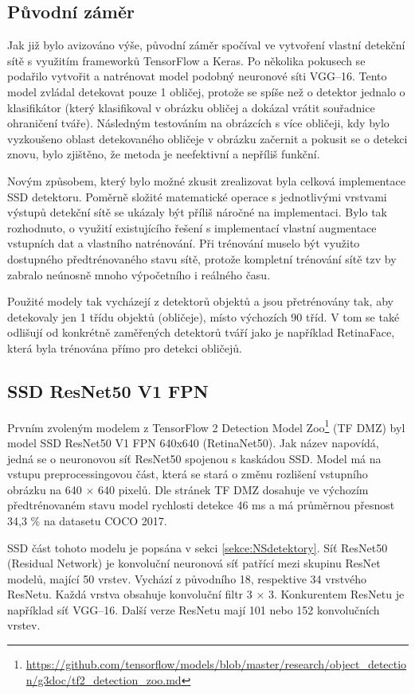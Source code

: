 \subsection*{Původní záměr}
Jak již bylo avizováno výše, původní záměr spočíval ve vytvoření vlastní detekční sítě s využitím frameworků TensorFlow a Keras. Po několika pokusech se podařilo vytvořit a natrénovat model podobný neuronové síti VGG--16. Tento model zvládal detekovat pouze 1 obličej, protože se spíše než o detektor jednalo o klasifikátor (který klasifikoval v obrázku obličej a dokázal vrátit souřadnice ohraničení tváře). Následným testováním na obrázcích s více obličeji, kdy bylo vyzkoušeno oblast detekovaného obličeje v obrázku začernit a pokusit se o detekci znovu, bylo zjištěno, že metoda je neefektivní a nepříliš funkční.

Novým způsobem, který bylo možné zkusit zrealizovat byla celková implementace SSD detektoru. Poměrně složité matematické operace s jednotlivými vrstvami výstupů detekční sítě se ukázaly být příliš náročné na implementaci. Bylo tak rozhodnuto, o využití existujícího řešení s implementací vlastní augmentace vstupních dat a vlastního natrénování. Při trénování muselo být využito dostupného předtrénovaného stavu sítě, protože kompletní trénování sítě tzv  by zabralo neúnosně mnoho výpočetního i reálného času.

Použité modely tak vycházejí z detektorů objektů a jsou přetrénovány tak, aby detekovaly jen 1 třídu objektů (obličeje), místo výchozích 90 tříd. V tom se také odlišují od konkrétně zaměřených detektorů tváří jako je například RetinaFace, která byla trénována přímo pro detekci obličejů.

\subsection*{SSD ResNet50 V1 FPN}
Prvním zvoleným modelem z TensorFlow 2 Detection Model Zoo\footnote{\url{https://github.com/tensorflow/models/blob/master/research/object_detection/g3doc/tf2_detection_zoo.md}} (TF DMZ) byl model SSD ResNet50 V1 FPN 640x640 (RetinaNet50). Jak název napovídá, jedná se o neuronovou síť ResNet50 spojenou s kaskádou SSD. Model má na vstupu preprocessingovou část, která se stará o změnu rozlišení vstupního obrázku na 640 $\times$ 640 pixelů. Dle stránek TF DMZ dosahuje ve výchozím předtrénovaném stavu model rychlosti detekce 46 ms a má průměrnou přesnost 34,3 \% na datasetu COCO 2017.

SSD část tohoto modelu je popsána v sekci \ref{sekce:NSdetektory}. Síť ResNet50 (Residual Network) \cite{resnet} je konvoluční neuronová síť patřící mezi skupinu ResNet modelů, mající 50 vrstev. Vychází z původního 18, respektive 34 vrstvého ResNetu. Každá vrstva obsahuje konvoluční filtr 3 $\times$ 3. Konkurentem ResNetu je například síť VGG--16. Další verze ResNetu mají 101 nebo 152 konvolučních vrstev.


